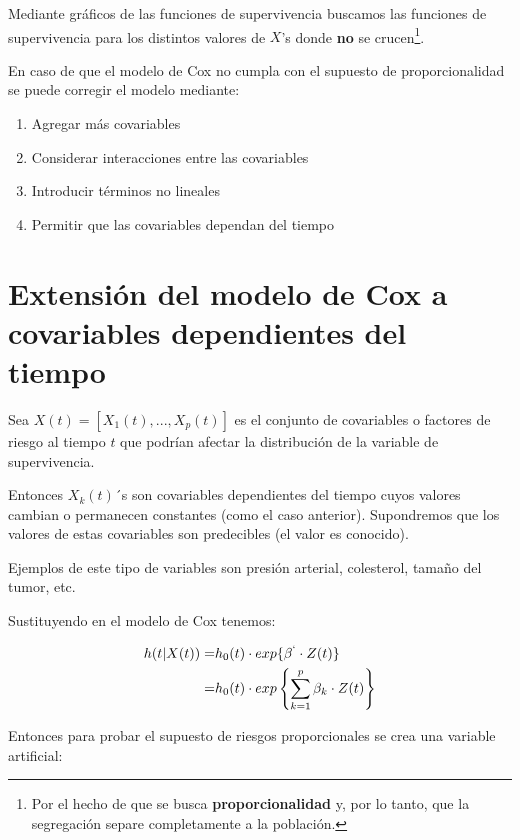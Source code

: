 \documentclass[
  a4paper,
  oneside,
  openany]{book}
\begin{document}
Mediante gráficos de las funciones de supervivencia buscamos las funciones de supervivencia para los distintos valores de \(X\)'s donde \textbf{no} se crucen\footnote{Por el hecho de que se busca \textbf{proporcionalidad} y, por lo tanto, que la segregación separe completamente a la población.}.

En caso de que el modelo de Cox no cumpla con el supuesto de proporcionalidad se puede corregir el modelo mediante:

\begin{enumerate}
\def\labelenumi{\arabic{enumi})}
\item
  Agregar más covariables
\item
  Considerar interacciones entre las covariables
\item
  Introducir términos no lineales
\item
  Permitir que las covariables dependan del tiempo
\end{enumerate}

\hypertarget{extensiuxf3n-del-modelo-de-cox-a-covariables-dependientes-del-tiempo}{%
\section{Extensión del modelo de Cox a covariables dependientes del tiempo}\label{extensiuxf3n-del-modelo-de-cox-a-covariables-dependientes-del-tiempo}}

Sea \(X(t)=[X_1(t),...,X_p(t)]\) es el conjunto de covariables o factores de riesgo al tiempo \(t\) que podrían afectar la distribución de la variable de supervivencia.

Entonces \(X_k(t)\)´s son covariables dependientes del tiempo cuyos valores cambian o permanecen constantes (como el caso anterior). Supondremos que los valores de estas covariables son predecibles (el valor es conocido).

Ejemplos de este tipo de variables son presión arterial, colesterol, tamaño del tumor, etc.

Sustituyendo en el modelo de Cox tenemos:

\[
\begin{split}
h(t|X(t))=&h_0 (t)\cdot exp\{\beta^`\cdot Z(t )\}\\
=&h_0(t) \cdot exp \left\{ \sum_{k=1}^{p} \beta_k \cdot Z(t)  \right\}
\end{split}
\]

Entonces para probar el supuesto de riesgos proporcionales se crea una variable artificial:
\end{document}
